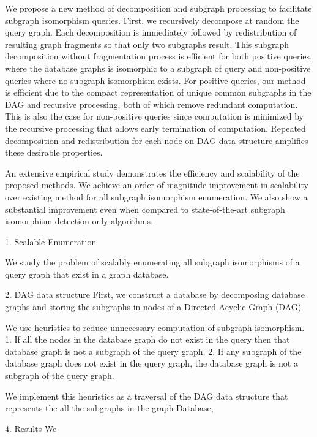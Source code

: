 We propose a new method of decomposition and subgraph processing to facilitate subgraph isomorphism queries. First, we recursively decompose at random  the query graph. Each decomposition is immediately followed by redistribution of resulting graph fragments so that only two subgraphs result. This subgraph decomposition without fragmentation process is efficient for both positive queries, where the database graphs is isomorphic to a subgraph of query and non-positive queries where no subgraph isomorphism exists. For positive queries, our method is efficient due to the compact representation of unique common subgraphs in the DAG  and recursive processing, both of which remove redundant computation. This is also the case for non-positive queries since computation is minimized by the recursive processing that allows early termination of computation. Repeated decomposition and redistribution for each node on DAG data structure amplifies these desirable properties. 


An extensive empirical study demonstrates the efficiency and scalability of the proposed methods. We achieve  an order of magnitude improvement in scalability over existing method for all subgraph isomorphism enumeration.
We also show a substantial improvement even when compared to state-of-the-art subgraph isomorphism detection-only algorithms. 



1. Scalable Enumeration

We study the problem of scalably enumerating all subgraph isomorphisms of a query graph that exist in a graph database.

2. DAG data structure
First, we construct a database by decomposing database graphs and storing the subgraphs in nodes of a Directed Acyclic Graph (DAG)


We use heuristics to reduce unnecessary computation of subgraph isomorphism. 
1. If all the nodes in the database graph do not exist in the query then that database graph is not a subgraph of the query graph.
2. If any subgraph of the database graph does not exist in the query graph, the database graph is not a subgraph of the query graph.

We implement this heuristics as a traversal of the DAG data structure that represents the all the subgraphs in the graph Database, 


4. Results
We 
